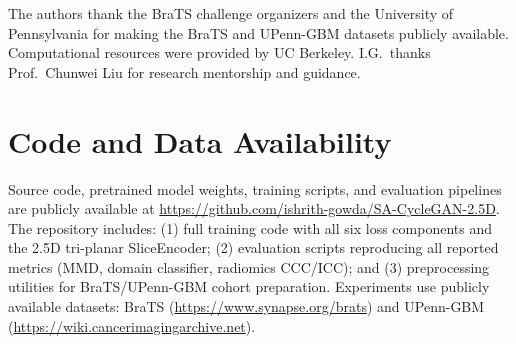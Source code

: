 \documentclass{article}
\begin{document}
The authors thank the BraTS challenge organizers and the University of Pennsylvania for
making the BraTS and UPenn-GBM datasets publicly available. Computational resources were
provided by UC Berkeley. I.G.\ thanks Prof.\ Chunwei Liu for research mentorship and
guidance.

\section*{Code and Data Availability}

Source code, pretrained model weights, training scripts, and evaluation pipelines are
publicly available at \url{https://github.com/ishrith-gowda/SA-CycleGAN-2.5D}. The repository
includes: (1) full training code with all six loss components and the 2.5D tri-planar
SliceEncoder; (2) evaluation scripts reproducing all reported metrics (MMD, domain
classifier, radiomics CCC/ICC); and (3) preprocessing utilities for BraTS/UPenn-GBM
cohort preparation. Experiments use publicly available datasets: BraTS
(\url{https://www.synapse.org/brats}) and UPenn-GBM (\url{https://wiki.cancerimagingarchive.net}).



\end{document}
